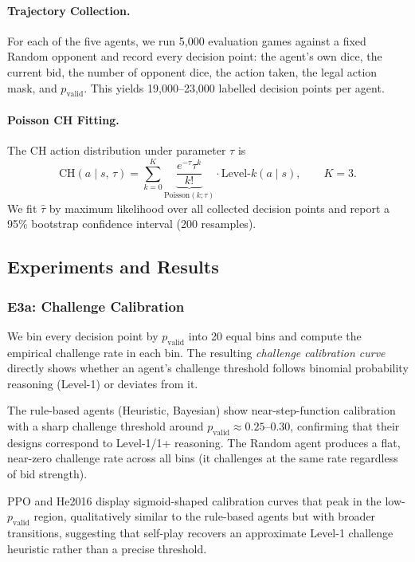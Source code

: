 \documentclass{article}
\begin{document}
\paragraph{Trajectory Collection.}
For each of the five agents, we run 5{,}000 evaluation games against a fixed Random opponent
and record every decision point: the agent's own dice, the current bid, the number of opponent
dice, the action taken, the legal action mask, and $p_{\text{valid}}$.  This yields 19{,}000--23{,}000
labelled decision points per agent.

\paragraph{Poisson CH Fitting.}
The CH action distribution under parameter $\tau$ is
\[
  \mathrm{CH}(a \mid s,\, \tau)
  = \sum_{k=0}^{K} \underbrace{\frac{e^{-\tau}\tau^k}{k!}}_{\text{Poisson}(k;\tau)}
    \cdot \mathrm{Level\text{-}}k(a \mid s), \qquad K = 3.
\]
We fit $\hat{\tau}$ by maximum likelihood over all collected decision points and report
a 95\% bootstrap confidence interval (200 resamples).

\subsection{Experiments and Results}

\subsubsection{E3a: Challenge Calibration}

We bin every decision point by $p_{\text{valid}}$ into 20 equal bins and compute the
empirical challenge rate in each bin. The resulting \emph{challenge calibration curve}
directly shows whether an agent's challenge threshold follows binomial probability
reasoning (Level-1) or deviates from it.

The rule-based agents (Heuristic, Bayesian) show near-step-function calibration with a
sharp challenge threshold around $p_{\text{valid}} \approx 0.25$--$0.30$, confirming that
their designs correspond to Level-1/1+ reasoning. The Random agent produces a flat, near-zero
challenge rate across all bins (it challenges at the same rate regardless of bid strength).

PPO and He2016 display sigmoid-shaped calibration curves that peak in the low-$p_{\text{valid}}$
region, qualitatively similar to the rule-based agents but with broader transitions, suggesting
that self-play recovers an approximate Level-1 challenge heuristic rather than a precise threshold.
\end{document}
